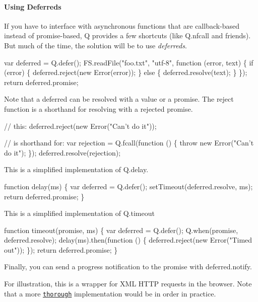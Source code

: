 \paragraph*{Using Deferreds}

If you have to interface with asynchronous functions that are callback-\/based instead of promise-\/based, Q provides a few shortcuts (like {\ttfamily Q.\+nfcall} and friends). But much of the time, the solution will be to use {\itshape deferreds}.


\begin{DoxyCode}
var deferred = Q.defer();
FS.readFile("foo.txt", "utf-8", function (error, text) \{
    if (error) \{
        deferred.reject(new Error(error));
    \} else \{
        deferred.resolve(text);
    \}
\});
return deferred.promise;
\end{DoxyCode}


Note that a deferred can be resolved with a value or a promise. The {\ttfamily reject} function is a shorthand for resolving with a rejected promise.


\begin{DoxyCode}
// this:
deferred.reject(new Error("Can't do it"));

// is shorthand for:
var rejection = Q.fcall(function () \{
    throw new Error("Can't do it");
\});
deferred.resolve(rejection);
\end{DoxyCode}


This is a simplified implementation of {\ttfamily Q.\+delay}.


\begin{DoxyCode}
function delay(ms) \{
    var deferred = Q.defer();
    setTimeout(deferred.resolve, ms);
    return deferred.promise;
\}
\end{DoxyCode}


This is a simplified implementation of {\ttfamily Q.\+timeout}


\begin{DoxyCode}
function timeout(promise, ms) \{
    var deferred = Q.defer();
    Q.when(promise, deferred.resolve);
    delay(ms).then(function () \{
        deferred.reject(new Error("Timed out"));
    \});
    return deferred.promise;
\}
\end{DoxyCode}


Finally, you can send a progress notification to the promise with {\ttfamily deferred.\+notify}.

For illustration, this is a wrapper for X\+ML H\+T\+TP requests in the browser. Note that a more \href{https://github.com/montagejs/mr/blob/71e8df99bb4f0584985accd6f2801ef3015b9763/browser.js#L29-L73}{\tt thorough} implementation would be in order in practice.



